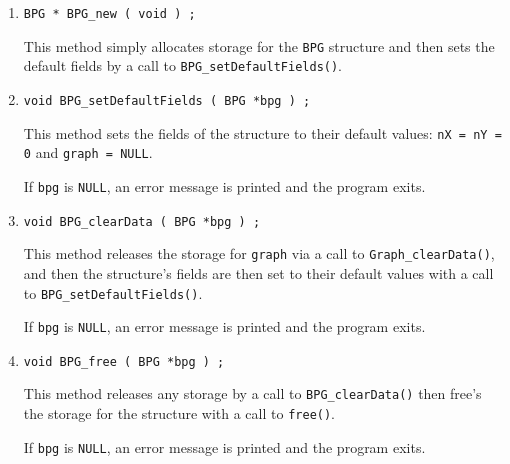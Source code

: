 \begin{enumerate}
\item
\begin{verbatim}
BPG * BPG_new ( void ) ;
\end{verbatim}
This method simply allocates storage for the {\tt BPG} structure 
and then sets the default fields by a call to 
{\tt BPG\_setDefaultFields()}.
\item
\begin{verbatim}
void BPG_setDefaultFields ( BPG *bpg ) ;
\end{verbatim}
This method sets the fields of the structure to their default values:
{\tt nX = nY = 0} and {\tt graph = NULL}.
\par {}
If {\tt bpg} is {\tt NULL},
an error message is printed and the program exits.
\item
\begin{verbatim}
void BPG_clearData ( BPG *bpg ) ;
\end{verbatim}
This method releases the storage for {\tt graph} via a call
to {\tt Graph\_clearData()}, and
then the structure's fields are then set to their default values
with a call to {\tt BPG\_setDefaultFields()}.
\par {}
If {\tt bpg} is {\tt NULL},
an error message is printed and the program exits.
\item
\begin{verbatim}
void BPG_free ( BPG *bpg ) ;
\end{verbatim}
This method releases any storage by a call to 
{\tt BPG\_clearData()} then free's the storage for the 
structure with a call to {\tt free()}.
\par {}
If {\tt bpg} is {\tt NULL},
an error message is printed and the program exits.
\end{enumerate}
\par
